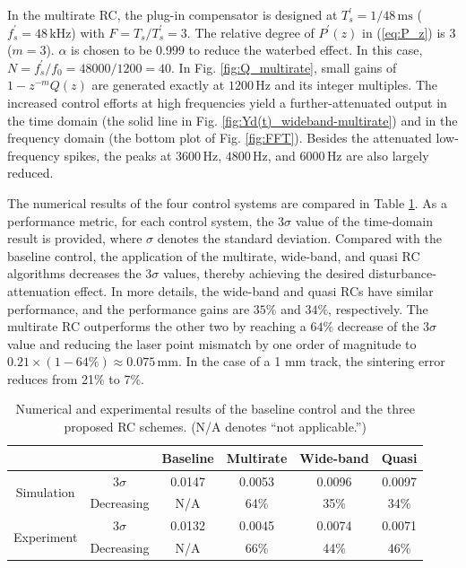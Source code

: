 \documentclass [11pt, proquest] {uwthesis}[2020/02/24]
\begin{document}
In the multirate RC, the plug-in compensator is designed at $T_{s}^{'}=1/48\,\text{ms}$
($f_{s}^{'}=48\,\text{kHz}$) with $F=T_{s}/T_{s}^{'}=3$. The relative
degree of $P^{'}(z)$ in (\ref{eq:P_z}) is 3 ($m=3$). $\alpha$
is chosen to be 0.999 to reduce the waterbed effect. In this case,
$N=f_{s}^{'}/f_{0}=48000/1200=40$. In Fig. \ref{fig:Q_multirate},
small gains of $1-z^{-m}Q(z)$ are generated exactly at $1200\,\text{Hz}$
and its integer multiples. The increased control efforts at high frequencies
yield a further-attenuated output in the time domain (the solid line
in Fig. \ref{fig:Yd(t)_wideband-multirate}) and in the frequency
domain (the bottom plot of Fig. \ref{fig:FFT}). Besides the attenuated
low-frequency spikes, the peaks at $3600\,\text{Hz}$, $4800\,\text{Hz}$,
and $6000\,\text{Hz}$ are also largely reduced.

The numerical results of the four control systems are compared in
Table \ref{tab:Experimental-results-of}. As a performance metric,
for each control system, the $3\sigma$ value of the time-domain result
is provided, where $\sigma$ denotes the standard deviation. Compared
with the baseline control, the application of the multirate, wide-band,
and quasi RC algorithms decreases the $3\sigma$ values, thereby achieving
the desired disturbance-attenuation effect. In more details, the wide-band
and quasi RCs have similar performance, and the performance gains
are $35\%$ and $34\%$, respectively. The multirate RC outperforms
the other two by reaching a $64\%$ decrease of the $3\sigma$ value
and reducing the laser point mismatch by one order of magnitude to
$0.21\times(1-64\%)\approx0.075\,\text{mm}$. In the case of a 1 mm
track, the sintering error reduces from 21\% to 7\%.
\begin{table}[!ht]
\caption{\label{tab:Experimental-results-of}Numerical and experimental results
of the baseline control and the three proposed RC schemes. (N/A denotes
``not applicable.'')}
\begin{centering}
\begin{tabular}{@{} cccccc @{}} 
\toprule
& & Baseline & Multirate & Wide-band & Quasi\\

\midrule
\multirow{2}{*}{Simulation} & 3$\sigma$ & 0.0147 & 0.0053 & 0.0096 & 0.0097 \\
& Decreasing & N/A & 64\% & 35\% & 34\% \\

\midrule
\multirow{2}{*}{Experiment} & 3$\sigma$ & 0.0132 & 0.0045 & 0.0074 & 0.0071 \\
& Decreasing & N/A & 66\% & 44\% & 46\% \\

\bottomrule
\end{tabular}
\par\end{centering}
\end{table}
\end{document}
